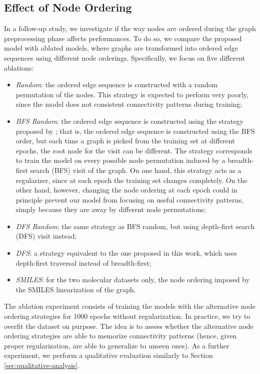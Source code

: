 \subsection{Effect of Node Ordering}
In a follow-up study, we investigate if the way nodes are ordered during the graph preprocessing phase affects performances. To do so, we compare the proposed model with ablated models, where graphs are transformed into ordered edge sequences using different node orderings. Specifically, we focus on five different ablations:
\begin{itemize}
    \item \emph{Random}: the ordered edge sequence is constructed with a random permutation of the nodes. This strategy is expected to perform very poorly, since the model does not  consistent connectivity patterns during training;
    \item \emph{BFS Random}: the ordered edge sequence is constructed using the strategy proposed by \citet{you2018graphrnn}; that is, the ordered edge sequence is constructed using the BFS order, but each time a graph is picked from the training set at different epochs, the root node for the visit can be different. The strategy corresponds to train the model on every possible node permutation induced by a breadth-first search (BFS) visit of the graph. On one hand, this strategy acts as a regularizer, since at each epoch the training set changes completely. On the other hand, however, changing the node ordering at each epoch could in principle prevent our model from focusing on useful connectivity patterns, simply because they are  away by different node permutations;
    \item \emph{DFS Random}: the same strategy as BFS random, but using depth-first search (DFS) visit instead;
    \item \emph{DFS}: a strategy equivalent to the one proposed in this work, which uses depth-first traversal instead of breadth-first;
    \item \emph{SMILES}: for the two molecular datasets only, the node ordering imposed by the SMILES linearization of the graph.
\end{itemize}
The ablation experiment consists of training the models with the alternative node ordering strategies for 1000 epochs without regularization. In practice, we try to overfit the dataset on purpose. The idea is to assess whether the alternative node ordering strategies are able to memorize connectivity patterns (hence, given proper regularization, are able to generalize to unseen ones). As a further experiment, we perform a qualitative evaluation similarly to Section \ref{sec:qualitative-analysis}.

